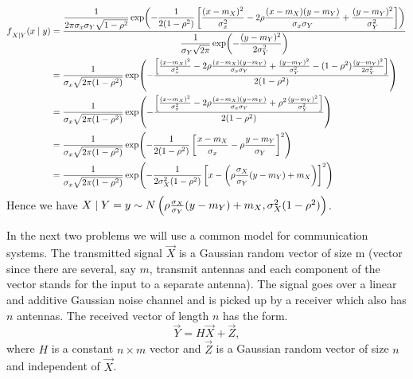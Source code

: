 \documentclass[a4paper, 11pt]{article}
\begin{document}
{    \begin{align*}
        f\strut_{X\mid Y}(x\mid y)&= \frac{\dfrac{1}{2\pi\sigma_x\sigma_Y\sqrt{1-\rho^2}}   \exp(-\dfrac1{2(1-\rho^2)}\left[    \dfrac{(x-m_X)^2}{\sigma_x^2} -2\rho\dfrac{(x-m_X)(y-m_Y)}{\sigma_x\sigma_Y}  +\dfrac{(y-m_Y)^2}{\sigma_Y^2}   \right] )}{\dfrac{1}{\sigma_Y\sqrt{2\pi}}\exp(-\dfrac{(y-m_Y)^2}{2\sigma_Y^2})}\\
                               & = \dfrac{1}{\sigma_x\sqrt{2\pi(1-\rho^2)}}\exp( -\dfrac{\left[    \frac{(x-m_X)^2}{\sigma_x^2} -2\rho\frac{(x-m_X)(y-m_Y)}{\sigma_x\sigma_Y}  +\frac{(y-m_Y)^2}{\sigma_Y^2}   -(1-\rho^2)\frac{(y-m_Y)^2}{2\sigma_Y^2}  \right]}{2(1-\rho^2)}    )\\
                               & = \dfrac{1}{\sigma_x\sqrt{2\pi(1-\rho^2)}}\exp( -\dfrac{\left[    \frac{(x-m_X)^2}{\sigma_x^2} -2\rho\frac{(x-m_X)(y-m_Y)}{\sigma_x\sigma_Y}  +\rho^2\frac{(y-m_Y)^2}{\sigma_Y^2}   \right]}{2(1-\rho^2)}    )\\
                               & = \dfrac{1}{\sigma_x\sqrt{2\pi(1-\rho^2)}} \exp( -\frac1{2(1-\rho^2)}  \left[ \frac{x-m_X}{\sigma_x} -\rho \frac{y-m_Y}{\sigma_Y}   \right]^2  )\\
                               & = \dfrac{1}{\sigma_x\sqrt{2\pi(1-\rho^2)}} \exp( -\frac1{2\sigma_X^2(1-\rho^2)}  \left[ x-\left(\rho \frac{\sigma_X}{\sigma_Y}({y-m_Y})+m_X\right)  \right]^2  )
    \end{align*}Hence we have $X\mid Y=y\sim N\left(\rho \frac{\sigma_X}{\sigma_Y}({y-m_Y})+m_X,   \sigma_X^2(1-\rho^2) \right)$.
}


\parinf\vspace*{2cm}

In the next two problems we will use a common model for communication systems.
The transmitted signal $\vec{X}$ is a Gaussian random vector of size m (vector since there
are several, say $m$, transmit antennas and each component of the vector stands for the
input to a separate antenna). The signal goes over a linear and additive Gaussian noise
channel and is picked up by a receiver which also has $n$ antennas. The received vector
of length $n$ has the form.\begin{equation}
    \vec{Y}=H\vec{X}+\vec{Z},\label{eq}
\end{equation}where $H$ is a constant $n\times m$ vector and $\vec{Z}$ is a Gaussian random vector of size $n$ and independent of $\vec{X}$.\parinn
\end{document}
